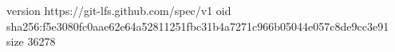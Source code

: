 version https://git-lfs.github.com/spec/v1
oid sha256:f5e3080fc0aae62e64a52811251fbc31b4a7271c966b05044e057c8de9cc3e91
size 36278

